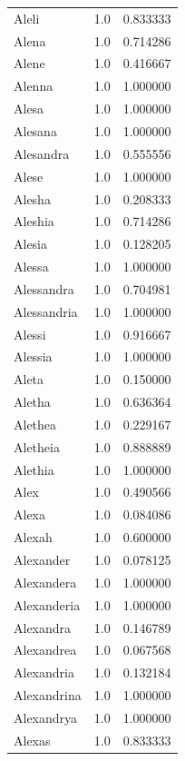\documentclass[
  letterpaper,
  DIV=11,
  numbers=noendperiod]{scrreprt}
\begin{document}
\begin{tabular}{lrr}
Aleli           &   1.0 &   0.833333 \\
Alena           &   1.0 &   0.714286 \\
Alene           &   1.0 &   0.416667 \\
Alenna          &   1.0 &   1.000000 \\
Alesa           &   1.0 &   1.000000 \\
Alesana         &   1.0 &   1.000000 \\
Alesandra       &   1.0 &   0.555556 \\
Alese           &   1.0 &   1.000000 \\
Alesha          &   1.0 &   0.208333 \\
Aleshia         &   1.0 &   0.714286 \\
Alesia          &   1.0 &   0.128205 \\
Alessa          &   1.0 &   1.000000 \\
Alessandra      &   1.0 &   0.704981 \\
Alessandria     &   1.0 &   1.000000 \\
Alessi          &   1.0 &   0.916667 \\
Alessia         &   1.0 &   1.000000 \\
Aleta           &   1.0 &   0.150000 \\
Aletha          &   1.0 &   0.636364 \\
Alethea         &   1.0 &   0.229167 \\
Aletheia        &   1.0 &   0.888889 \\
Alethia         &   1.0 &   1.000000 \\
Alex            &   1.0 &   0.490566 \\
Alexa           &   1.0 &   0.084086 \\
Alexah          &   1.0 &   0.600000 \\
Alexander       &   1.0 &   0.078125 \\
Alexandera      &   1.0 &   1.000000 \\
Alexanderia     &   1.0 &   1.000000 \\
Alexandra       &   1.0 &   0.146789 \\
Alexandrea      &   1.0 &   0.067568 \\
Alexandria      &   1.0 &   0.132184 \\
Alexandrina     &   1.0 &   1.000000 \\
Alexandrya      &   1.0 &   1.000000 \\
Alexas          &   1.0 &   0.833333 \\

\end{tabular}
\end{document}

